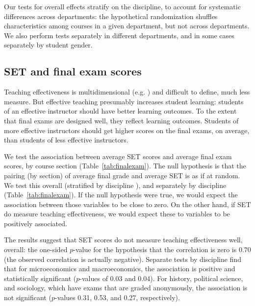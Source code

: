 \documentclass[12pt]{article}
\newcommand{\todo}[1]{{\color{red}{TO DO: \sc #1}}}
\begin{document}
Our tests for overall effects stratify on the discipline, to account for systematic
differences across departments:
the hypothetical randomization shuffles characteristics among courses in a given
department, but not across departments.
We also perform tests separately in different departments, and in some cases separately by
student gender.

\subsection{SET and final exam scores}
Teaching effectiveness is multidimensional (e.g. \citet{Marsh1997}) and difficult to define,
much less measure. 
But effective teaching presumably increases student learning:
students of an effective instructor should have better learning outcomes. 
To the extent that final exams are designed well, they reflect learning outcomes.
Students of more effective instructors should get higher scores on the final exams, on average,
than students of less effective instructors.

We test the association between average SET scores and average final exam scores, by course
section (Table~\ref{tab:finalexam}). 
The null hypothesis is that the pairing (by section)
of average final grade and average SET is as if at random.
We test this overall (stratified by discipline \todo{check this!}), and separately
by discipline (Table~\ref{tab:finalexam}).
If the null hypothesis were true, we would expect the association between those variables to be 
close to zero.
On the other hand, if SET do measure teaching effectiveness, we would expect these to 
variables to be positively associated.

The results suggest that SET scores do not measure teaching effectiveness well, overall:
the one-sided $p$-value for the hypothesis that the correlation is zero is 0.70 (the
observed correlation is actually negative). 
Separate tests by discipline find that for microeconomics and macroeconomics, the 
association is positive and statistically
significant ($p$-values of 0.03 and 0.04). 
For history, political science, and sociology, which have exams that are graded anonymously,
the association is not significant ($p$-values 0.31, 0.53, and 0.27, respectively). 
\end{document}
